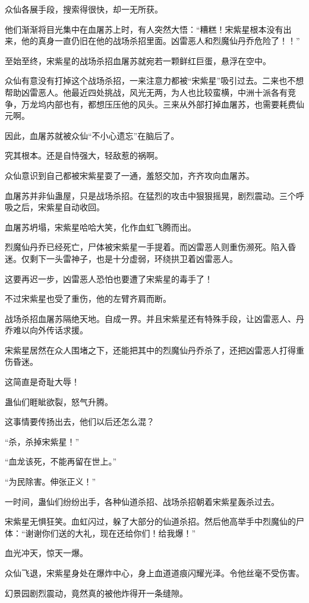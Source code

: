 \begin{this_body}
众仙各展手段，搜索得很快，却一无所获。

他们渐渐将目光集中在血屠苏上时，有人突然大悟：“糟糕！宋紫星根本没有出来，他的真身一直仍旧在他的战场杀招里面。凶雷恶人和烈魔仙丹乔危险了！！”

至始至终，宋紫星的战场杀招血屠苏就宛若一颗鲜红巨蛋，悬浮在空中。

众仙有意没有打掉这个战场杀招，一来注意力都被“宋紫星”吸引过去。二来也不想帮助凶雷恶人。他最近四处挑战，风光无两，为人也比较蛮横，中洲十派各有竞争，万龙坞内部也有，都想压压他的风头。三来从外部打掉血屠苏，也需要耗费仙元啊。

因此，血屠苏就被众仙“不小心遗忘”在脑后了。

究其根本。还是自恃强大，轻敌惹的祸啊。

众仙意识到自己都被宋紫星耍了一通，羞怒交加，齐齐攻向血屠苏。

血屠苏并非仙蛊屋，只是战场杀招。在猛烈的攻击中狠狠摇晃，剧烈震动。三个呼吸之后，宋紫星自动收回。

血屠苏坍塌，宋紫星哈哈大笑，化作血虹飞腾而出。

烈魔仙丹乔已经死亡，尸体被宋紫星一手提着。而凶雷恶人则重伤濒死。陷入昏迷。仅剩下一头雷神子，也是十分虚弱，环绕拱卫着凶雷恶人。

这要再迟一步，凶雷恶人恐怕也要遭了宋紫星的毒手了！

不过宋紫星也受了重伤，他的左臂齐肩而断。

战场杀招血屠苏隔绝天地。自成一界。并且宋紫星还有特殊手段，让凶雷恶人、丹乔难以向外传话求援。

宋紫星居然在众人围堵之下，还能把其中的烈魔仙丹乔杀了，还把凶雷恶人打得重伤昏迷。

这简直是奇耻大辱！

蛊仙们睚眦欲裂，怒气升腾。

这事情要传扬出去，他们以后还怎么混？

“杀，杀掉宋紫星！”

“血龙该死，不能再留在世上。”

“为民除害。伸张正义！”

一时间，蛊仙们纷纷出手，各种仙道杀招、战场杀招朝着宋紫星轰杀过去。

宋紫星无惧狂笑。血虹闪过，躲了大部分的仙道杀招。然后他高举手中烈魔仙的尸体：“谢谢你们送的大礼，现在还给你们！给我爆！”

血光冲天，惊天一爆。

众仙飞退，宋紫星身处在爆炸中心，身上血道道痕闪耀光泽。令他丝毫不受伤害。

幻景园剧烈震动，竟然真的被他炸得开一条缝隙。


\end{this_body}
